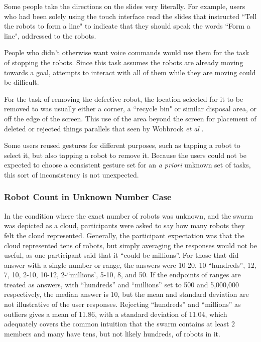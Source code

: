 


 
Some people  take the directions on the slides very literally. 
For example, users who had been solely using the touch interface read the slides that instructed ``Tell the robots to form a line" to indicate that they should speak the words ``Form a line", addressed to the robots.

People  who didn't otherwise want voice commands would use them for the task of stopping the robots. 
Since this task assumes the robots are already moving towards a goal, attempts to interact with all of them while they are moving could be difficult. 

For the task of removing the defective robot, the location selected for it to be removed to was usually either a corner, a ``recycle bin" or similar disposal area, or off the edge of the screen. This use of the area beyond the screen for placement of deleted or rejected things parallels that seen by Wobbrock \textit{et al} \citep{wobbrock2009user}.

Some users reused gestures for different purposes, such as tapping a robot to select it, but also tapping a robot to remove it.
Because the users could not be expected to choose a consistent gesture set for an \emph{a priori} unknown set of tasks, this sort of inconsistency is not unexpected. 

\subsubsection{Robot Count in Unknown Number Case} \label{section:Robot_Count_in_Unknown_Number_Case}

In the condition where the exact number of robots was unknown, and the swarm was depicted as a cloud, participants were asked to say how many robots they felt the cloud represented. 
Generally, the participant expectation was that the cloud represented tens of robots, but simply averaging the responses would not be useful, as one participant said that it ``could be millions''. 
For those that did answer with a single number or range, the answers were 10-20, 10-``hundreds'', 12, 7, 10, 2-10, 10-12, 2-``millions', 5-10, 8, and 50. 
If the endpoints of ranges are treated as answers, with ``hundreds'' and ``millions'' set to 500 and 5,000,000 respectively, the median answer is 10, but the mean and standard deviation are not illustrative of the user responses. 
Rejecting ``hundreds'' and ``millions'' as outliers gives a mean of 11.86, with a standard deviation of 11.04, which adequately covers the common intuition that the swarm contains at least 2 members and many have tens, but not likely hundreds, of robots in it.

